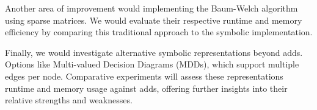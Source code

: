 Another area of improvement would implementing the Baum-Welch algorithm using sparse matrices. 
We would evaluate their respective runtime and memory efficiency by comparing this traditional approach to the symbolic implementation. 

Finally, we would investigate alternative symbolic representations beyond \glspl{add}. 
Options like Multi-valued Decision Diagrams (MDDs), which support multiple edges per node.
Comparative experiments will assess these representations runtime and memory usage against \glspl{add}, offering further insights into their relative strengths and weaknesses.